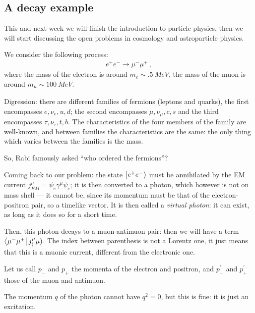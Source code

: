 \documentclass[main.tex]{subfiles}
\begin{document}
\subsection{A decay example}


This and next week we will finish the introduction to particle physics, then we will start discussing the open problems in cosmology and astroparticle physics. 

We consider the following process: 
%
\begin{align}
e^{+} e^{-} \to \mu^- \mu^+
\,,
\end{align}
%
where the mass of the electron is around \(m_e \sim \SI{.5}{MeV}\), the mass of the muon is around \(m_{\mu } \sim \SI{100}{MeV}\). 

Digression: there are different families of fermions (leptons and quarks), the first encompasses \(e, \nu_{e}, u, d\); the second encompasses \(\mu, \nu_{\mu }, c, s\) and the third encompasses \(\tau, \nu_{\tau }, t, b\). 
The characteristics of the four members of the family are well-known, and between families the characteristics are the same: the only thing which varies between the families is the mass. 

So, Rabi famously asked ``who ordered the fermions''? 

Coming back to our problem: the state \(\ket{e^{+}e^{-}}\) must be annihilated by the EM current \(j^{\mu }_{EM} = \overline{\psi}_e \gamma^{\mu } \psi_e \); it is then converted to a photon, which however is not on mass shell --- it cannot be, since its momentum must be that of the electron-positron pair, so a timelike vector. 
It is then called a \emph{virtual photon}: it can exist, as long as it does so for a short time. 

Then, this photon decays to a muon-antimuon pair: then we will have a term \(\bra{\mu^- \mu^+} j^{\mu }_(\mu )\). The index between parenthesis is not a Lorentz one, it just means that this is a muonic current, different from the electronic one.

Let us call \(p_{-}\) and \(p_{+}\) the momenta of the electron and positron, and \(p^{\prime }_{-}\) and \(p^{\prime }_{+}\) those of the muon and antimuon. 

The momentum \(q\) of the photon cannot have \(q^2  =0 \), but this is fine: it is just an excitation. 
\end{document}
